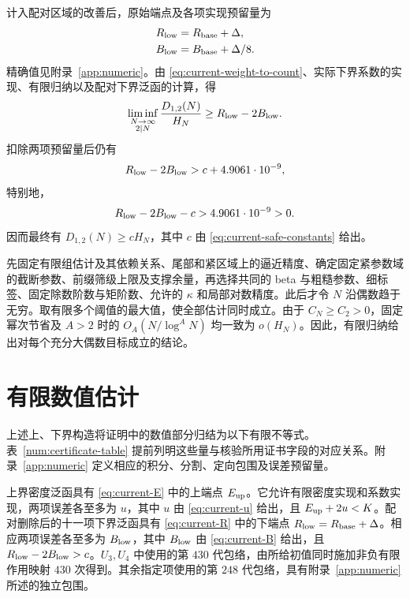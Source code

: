 计入配对区域的改善后，原始端点及各项实现预留量为
\begin{align}
 R_{\rm low}&=R_{\rm base}+\Delta,\label{eq:current-R}\\
 B_{\rm low}&=B_{\rm base}+\Delta/8.\label{eq:current-B}
\end{align}
精确值见附录~\ref{app:numeric}。由 \eqref{eq:current-weight-to-count}、实际下界系数的实现、有限归纳以及配对下界泛函的计算，得
\begin{equation}
 \liminf_{\substack{N\to\infty\\2\mid N}}
         \frac{D_{1,2}(N)}{H_N}\ge R_{\rm low}-2B_{\rm low}.
 \label{eq:current-lower-derived}
\end{equation}
扣除两项预留量后仍有
\begin{equation}
                  R_{\rm low}-2B_{\rm low}>c+4.9061\cdot10^{-9},
                  \label{eq:current-after-budgets}
\end{equation}
特别地，
\begin{equation}
                  R_{\rm low}-2B_{\rm low}-c>4.9061\cdot10^{-9}>0.
                  \label{eq:current-lower-slack}
\end{equation}
因而最终有 $D_{1,2}(N)\ge cH_N$，其中 $c$ 由 \eqref{eq:current-safe-constants} 给出。

先固定有限组估计及其依赖关系、尾部和紧区域上的逼近精度、确定固定紧参数域的截断参数、前缀筛级上限及支撑余量，再选择共同的 beta 与粗糙参数、细标签、固定除数阶数与矩阶数、允许的 $\kappa$ 和局部对数精度。此后才令 $N$ 沿偶数趋于无穷。取有限多个阈值的最大值，使全部估计同时成立。由于 $C_N\ge C_2>0$，固定幂次节省及 $A>2$ 时的 $O_A(N/\log^AN)$ 均一致为 $o(H_N)$。因此，有限归纳给出对每个充分大偶数目标成立的结论。

\section{有限数值估计}
\label{sec:current-numeric}

上述上、下界构造将证明中的数值部分归结为以下有限不等式。表~\ref{num:certificate-table} 提前列明这些量与核验所用证书字段的对应关系。附录~\ref{app:numeric} 定义相应的积分、分割、定向包围及误差预留量。

\begin{lemma}
\label{lem:numerical-endpoints}
上界密度泛函具有 \eqref{eq:current-E} 中的上端点 $E_{\rm up}$。它允许有限密度实现和系数实现，两项误差各至多为 $u$，其中 $u$ 由 \eqref{eq:current-u} 给出，且 $E_{\rm up}+2u<K$。配对删除后的十一项下界泛函具有 \eqref{eq:current-R} 中的下端点 $R_{\rm low}=R_{\rm base}+\Delta$。相应两项误差各至多为 $B_{\rm low}$，其中 $B_{\rm low}$ 由 \eqref{eq:current-B} 给出，且 $R_{\rm low}-2B_{\rm low}>c$。$U_3,U_4$ 中使用的第 $430$ 代包络，由所给初值同时施加非负有限作用映射 $430$ 次得到。其余指定项使用的第 $248$ 代包络，具有附录~\ref{app:numeric} 所述的独立包围。
\end{lemma}


